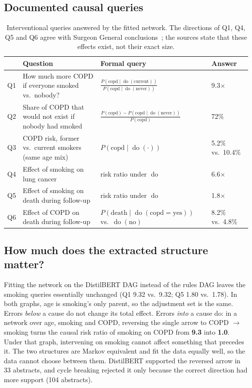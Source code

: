\documentclass[11pt,a4paper]{article}
\newcommand{\doop}{\operatorname{do}}
\begin{document}
\subsection{Documented causal queries}

\begin{table}[H]
\centering\small
\begin{tabularx}{\linewidth}{@{}lYYl@{}}
\toprule
 & Question & Formal query & Answer \\
\midrule
Q1 & How much more COPD if everyone smoked vs.\ nobody? & $\frac{P(\text{copd}\mid\doop(\text{current}))}{P(\text{copd}\mid\doop(\text{never}))}$ & 9.3$\times$ \\
Q2 & Share of COPD that would not exist if nobody had smoked & $\frac{P(\text{copd})-P(\text{copd}\mid\doop(\text{never}))}{P(\text{copd})}$ & 72\% \\
Q3 & COPD risk, former vs.\ current smokers (same age mix) & $P(\text{copd}\mid\doop(\cdot))$ & 5.2\% vs.\ 10.4\% \\
Q4 & Effect of smoking on lung cancer & risk ratio under $\doop$ & 6.6$\times$ \\
Q5 & Effect of smoking on death during follow-up & risk ratio under $\doop$ & 1.8$\times$ \\
Q6 & Effect of COPD on death during follow-up & $P(\text{death}\mid\doop(\text{copd}{=}\text{yes}))$ vs.\ $\doop(\text{no})$ & 8.2\% vs.\ 4.8\% \\
\bottomrule
\end{tabularx}
\caption{Interventional queries answered by the fitted network. The directions of Q1, Q4, Q5 and Q6 agree with Surgeon General
conclusions~\citep{sgr2014}; the sources state that these effects exist, not their exact size.}
\label{tab:queries}
\end{table}

\subsection{How much does the extracted structure matter?}

Fitting the network on the DistilBERT DAG instead of the rules DAG leaves the smoking queries essentially unchanged (Q1 9.32 vs.\ 9.32;
Q5 1.80 vs.\ 1.78). In both graphs, age is smoking's only parent, so the adjustment set is the same. Errors \emph{below} a cause do not
change its total effect. Errors \emph{into} a cause do: in a network over age, smoking and COPD, reversing the single arrow to COPD
$\rightarrow$ smoking turns the causal risk ratio of smoking on COPD from \textbf{9.3} into \textbf{1.0}. Under that graph,
intervening on smoking cannot affect something that precedes it. The two structures are Markov equivalent and fit the data equally well,
so the data cannot choose between them. DistilBERT supported the reversed arrow in 33 abstracts, and cycle breaking rejected it only because the correct
direction had more support (104 abstracts).
\end{document}
